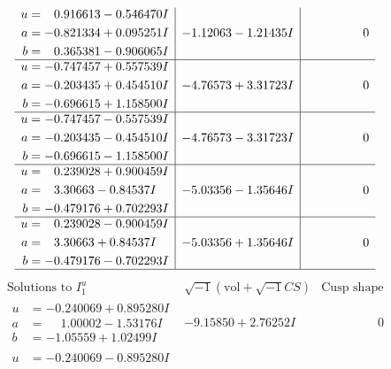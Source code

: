\documentclass[1p]{elsarticle_modified}
\theoremstyle{definition}
\newcommand{\I}{\sqrt{-1}}
\begin{document}
$$\begin{array}{c|c|c}
\begin{aligned}
u &= \phantom{-}0.916613 - 0.546470 I \\
a &= -0.821334 + 0.095251 I \\
b &= \phantom{-}0.365381 - 0.906065 I\end{aligned}
 & -1.12063 - 1.21435 I & \phantom{-0.000000 } 0 \\ \hline\begin{aligned}
u &= -0.747457 + 0.557539 I \\
a &= -0.203435 + 0.454510 I \\
b &= -0.696615 + 1.158500 I\end{aligned}
 & -4.76573 + 3.31723 I & \phantom{-0.000000 } 0 \\ \hline\begin{aligned}
u &= -0.747457 - 0.557539 I \\
a &= -0.203435 - 0.454510 I \\
b &= -0.696615 - 1.158500 I\end{aligned}
 & -4.76573 - 3.31723 I & \phantom{-0.000000 } 0 \\ \hline\begin{aligned}
u &= \phantom{-}0.239028 + 0.900459 I \\
a &= \phantom{-}3.30663 - 0.84537 I \\
b &= -0.479176 + 0.702293 I\end{aligned}
 & -5.03356 - 1.35646 I & \phantom{-0.000000 } 0 \\ \hline\begin{aligned}
u &= \phantom{-}0.239028 - 0.900459 I \\
a &= \phantom{-}3.30663 + 0.84537 I \\
b &= -0.479176 - 0.702293 I\end{aligned}
 & -5.03356 + 1.35646 I & \phantom{-0.000000 } 0\\
 \hline 
 \end{array}$$\newpage$$\begin{array}{c|c|c}  
\text{Solutions to }I^u_{1}& \I (\text{vol} + \sqrt{-1}CS) & \text{Cusp shape}\\
 \hline 
\begin{aligned}
u &= -0.240069 + 0.895280 I \\
a &= \phantom{-}1.00002 - 1.53176 I \\
b &= -1.05559 + 1.02499 I\end{aligned}
 & -9.15850 + 2.76252 I & \phantom{-0.000000 } 0 \\ \hline\begin{aligned}
u &= -0.240069 - 0.895280 I \\

\end{aligned}
\end{array}$$
\end{document}
